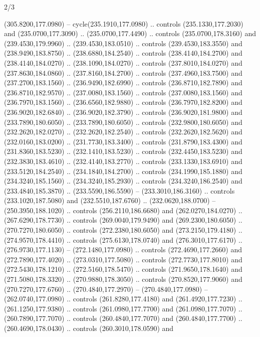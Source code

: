 \begin{flagdescription}{2/3}
\begin{scope}[xshift=0.5\flaglength,yshift=0.5\flagwidth,scale=\flagwidth/259.2]
\begin{scope}[y=0.8pt, x=0.8pt, yscale=-1,shift={(-243,-162)}]
      (305.8200,177.0980) -- cycle(235.1910,177.0980) .. controls
      (235.1330,177.2030) and (235.0700,177.3090) .. (235.0700,177.4490) .. controls
      (235.0700,178.3160) and (239.4530,179.9960) .. (239.4530,183.0510) .. controls
      (239.4530,183.3550) and (238.9490,183.8750) .. (238.6880,184.2540) .. controls
      (238.4140,184.2700) and (238.4140,184.0270) .. (238.1090,184.0270) .. controls
      (237.8010,184.0270) and (237.8630,184.0860) .. (237.8160,184.2700) .. controls
      (237.4960,183.7500) and (237.2700,183.1560) .. (236.9490,182.6990) .. controls
      (236.8710,182.7890) and (236.8710,182.9570) .. (237.0080,183.1560) .. controls
      (237.0080,183.1560) and (236.7970,183.1560) .. (236.6560,182.9880) .. controls
      (236.7970,182.8200) and (236.9020,182.6840) .. (236.9020,182.3790) .. controls
      (236.9020,181.9800) and (233.7890,180.6050) .. (233.7890,180.6050) .. controls
      (232.9800,180.6050) and (232.2620,182.0270) .. (232.2620,182.2540) .. controls
      (232.2620,182.5620) and (232.0160,183.0200) .. (231.7730,183.3400) .. controls
      (231.8790,183.4300) and (231.8360,183.5230) .. (232.1410,183.5230) .. controls
      (232.4450,183.5230) and (232.3830,183.4610) .. (232.4140,183.2770) .. controls
      (233.1330,183.6910) and (233.5120,184.2540) .. (234.1840,184.2700) .. controls
      (234.1990,185.1880) and (234.3240,185.1560) .. (234.3240,185.2930) .. controls
      (234.3240,186.2540) and (233.4840,185.3870) .. (233.5590,186.5590) --
      (233.3010,186.3160) .. controls (233.1020,187.5080) and (232.5510,187.6760) ..
      (232.0620,188.0700) -- (250.3950,188.1020) .. controls (256.2110,186.6680) and
      (262.0270,184.0270) .. (267.6290,178.7730) .. controls (269.0040,179.9490) and
      (269.2300,180.6050) .. (270.7270,180.6050) .. controls (272.2380,180.6050) and
      (273.2150,179.4180) .. (274.9570,178.4410) .. controls (275.6130,178.0740) and
      (276.3010,177.6170) .. (276.9730,177.1130) -- (272.1480,177.0980) .. controls
      (272.4690,177.2660) and (272.7890,177.4020) .. (273.0310,177.5080) .. controls
      (272.7730,177.8010) and (272.5430,178.1210) .. (272.5160,178.5470) .. controls
      (271.9650,178.1640) and (271.5080,178.3320) .. (270.9880,178.3050) .. controls
      (270.8520,177.9060) and (270.7270,177.6760) .. (270.4840,177.2970) --
      (270.4840,177.0980) -- (262.0740,177.0980) .. controls (261.8280,177.4180) and
      (261.4920,177.7230) .. (261.1250,177.9380) .. controls (261.0980,177.7700) and
      (261.0980,177.7070) .. (260.7890,177.7070) .. controls (260.4840,177.7070) and
      (260.4840,177.7700) .. (260.4690,178.0430) .. controls (260.3010,178.0590) and

\end{scope}
\end{scope}
\end{flagdescription}

